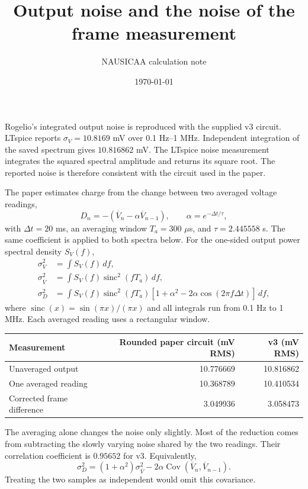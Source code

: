 \documentclass[11pt]{article}
\title{Output noise and the noise of the frame measurement}
\author{NAUSICAA calculation note}
\date{\today}
\begin{document}
\maketitle
Rogelio's integrated output noise is reproduced with the supplied v3 circuit.
LTspice reports $\sigma_V=10.8169$ mV over 0.1 Hz--1 MHz.
Independent integration of the saved spectrum gives $10.816862$ mV.
The LTspice noise measurement integrates the squared spectral amplitude and
returns its square root. The reported noise is therefore consistent with the
circuit used in the paper.

The paper estimates charge from the change between two averaged voltage readings,
\[
 D_n=-(\overline V_n-\alpha\overline V_{n-1}),\qquad
 \alpha=e^{-\Delta t/\tau},
\]
with $\Delta t=20$ ms, an averaging window $T_a=300$ $\mu$s,
and $\tau=2.445558$ s. The same coefficient is applied to both spectra below.
For the one-sided output power spectral density $S_V(f)$,
\begin{align*}
 \sigma_V^2 &=\int S_V(f)\,df,\\
 \sigma_{\overline V}^2 &=\int S_V(f)\operatorname{sinc}^2(fT_a)\,df,\\
 \sigma_D^2 &=\int S_V(f)\operatorname{sinc}^2(fT_a)
 [1+\alpha^2-2\alpha\cos(2\pi f\Delta t)]\,df,
\end{align*}
where $\operatorname{sinc}(x)=\sin(\pi x)/(\pi x)$ and all integrals run
from 0.1 Hz to 1 MHz. Each averaged reading uses a rectangular window.

\begin{center}\begin{tabular}{lrr}\toprule
Measurement & Rounded paper circuit (mV RMS) & v3 (mV RMS)\\\midrule
Unaveraged output & 10.776669 & 10.816862 \\
One averaged reading & 10.368789 & 10.410534 \\
Corrected frame difference & 3.049936 & 3.058473 \\
\bottomrule\end{tabular}\end{center}

The averaging alone changes the noise only slightly. Most of the reduction
comes from subtracting the slowly varying noise shared by the two readings.
Their correlation coefficient is $0.95652$ for v3. Equivalently,
\[
 \sigma_D^2=(1+\alpha^2)\sigma_{\overline V}^2
 -2\alpha\operatorname{Cov}(\overline V_n,\overline V_{n-1}).
\]
Treating the two samples as independent would omit this covariance.
\end{document}
